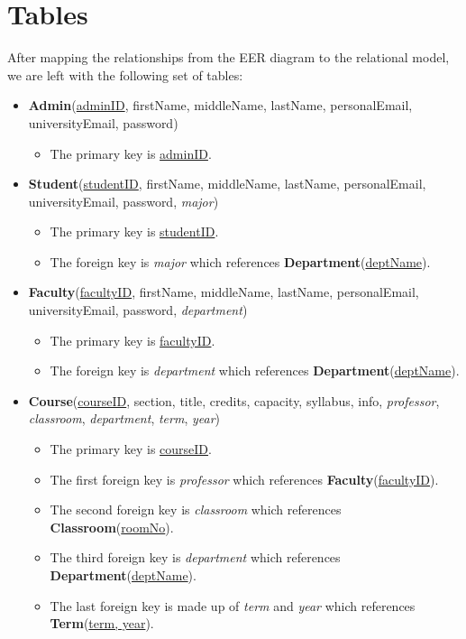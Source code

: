 \documentclass{report}
\newcommand{\usection}[1]{\section*{#1}
\addcontentsline{toc}{section}{\protect\numberline{}#1}}
\begin{document}
\usection{Tables}

After mapping the relationships from the EER diagram to the relational model, we are left with the following set of tables:

\begin{itemize}

    \item \textbf{Admin}(\underline{adminID}, firstName, middleName, lastName, personalEmail, universityEmail, password)
    \begin{itemize}
        \item The primary key is \underline{adminID}.
    \end{itemize}

    \item \textbf{Student}(\underline{studentID}, firstName, middleName, lastName, personalEmail, universityEmail, password, \textit{major})
    \begin{itemize}
        \item The primary key is \underline{studentID}.
        \item The foreign key is \textit{major} which references \textbf{Department}(\underline{deptName}).
    \end{itemize}

    \item \textbf{Faculty}(\underline{facultyID}, firstName, middleName, lastName, personalEmail, universityEmail, password, \textit{department})
    \begin{itemize}
        \item The primary key is \underline{facultyID}.
        \item The foreign key is \textit{department} which references \textbf{Department}(\underline{deptName}).
    \end{itemize}

    \item \textbf{Course}(\underline{courseID}, section, title, credits, capacity, syllabus, info, \textit{professor}, \textit{classroom}, \textit{department}, \textit{term}, \textit{year})
    \begin{itemize}
        \item The primary key is \underline{courseID}.
        \item The first foreign key is \textit{professor} which references \textbf{Faculty}(\underline{facultyID}).
        \item The second foreign key is \textit{classroom} which references \textbf{Classroom}(\underline{roomNo}).
        \item The third foreign key is \textit{department} which references \textbf{Department}(\underline{deptName}).
        \item The last foreign key is made up of \textit{term} and \textit{year} which references \textbf{Term}(\underline{term, year}).
    \end{itemize}


\end{itemize}
\end{document}
